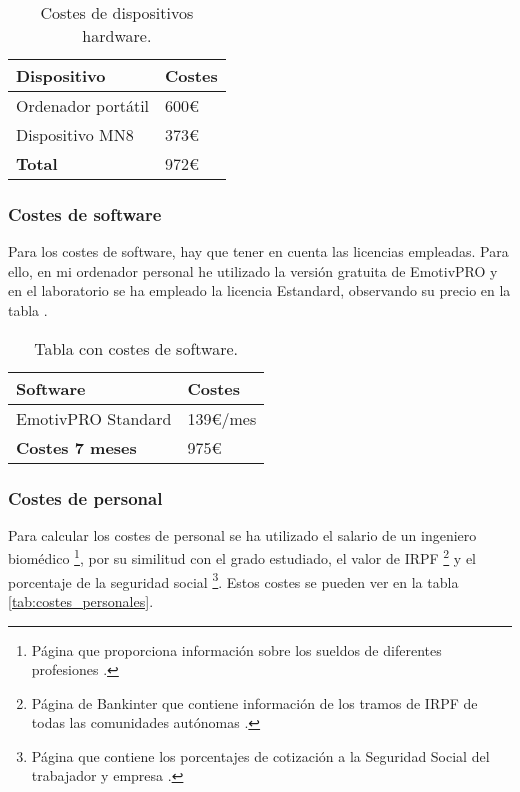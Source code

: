\begin{table}[H]
\centering
\begin{tabular}{|l|l|}
\hline
\rowcolor[HTML]{BFBFBF} 
\textbf{Dispositivo} & \textbf{Costes} \\ \hline
Ordenador portátil & 600€ \\ \hline
Dispositivo MN8 & 373€ \\ \hline
\textbf{Total} & 972€ \\ \hline
\end{tabular}
\caption{Costes de dispositivos hardware.}
\label{tab:costes_hardware}
\end{table}

\subsubsection{Costes de software}
Para los costes de software, hay que tener en cuenta las licencias empleadas. Para ello, en mi ordenador personal he utilizado la versión gratuita de EmotivPRO y en el laboratorio se ha empleado la licencia Estandard, observando su precio en la tabla .

\begin{table}[h]
\centering
\begin{tabular}{|l|l|}
\hline
\rowcolor[HTML]{BFBFBF} 
\textbf{Software} & \textbf{Costes} \\ \hline
EmotivPRO Standard &  139€/mes \\ \hline
\textbf{Costes 7 meses} & 975€ \\ \hline
\end{tabular}
\caption{Tabla con costes de software.}
\label{tab:costes_software}
\end{table}

\subsubsection{Costes de personal}
Para calcular los costes de personal se ha utilizado el salario de un ingeniero biomédico \cite{SueldoIngBiomed} \footnote{Página que proporciona información sobre los sueldos de diferentes profesiones \cite{SueldoIngBiomed}.}, por su similitud con el grado estudiado, el valor de IRPF \cite{IRPF2024} \footnote{Página de Bankinter que contiene información de los tramos de IRPF de todas las comunidades autónomas \cite{IRPF2024}.} y el porcentaje de la seguridad social \cite{SeguridadSocial} \footnote{Página que contiene los porcentajes de cotización a la Seguridad Social del trabajador y empresa \cite{SeguridadSocial}.}. Estos costes se pueden ver en la tabla \ref{tab:costes_personales}.

